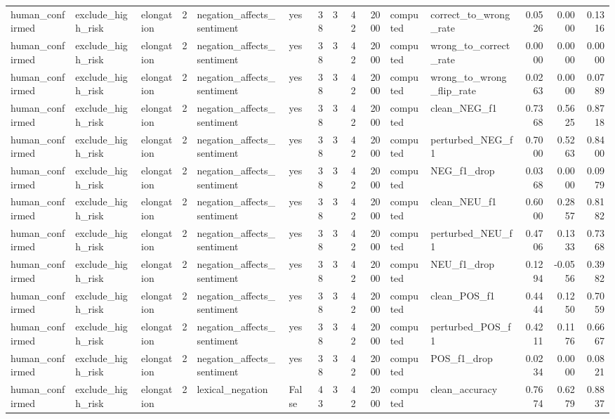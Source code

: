 \begin{tabular}{lllrllrrrrllrrr}
human_confirmed & exclude_high_risk & elongation & 2 & negation_affects_sentiment & yes & 38 & 3 & 42 & 2000 & computed & correct_to_wrong_rate & 0.0526 & 0.0000 & 0.1316 \\
human_confirmed & exclude_high_risk & elongation & 2 & negation_affects_sentiment & yes & 38 & 3 & 42 & 2000 & computed & wrong_to_correct_rate & 0.0000 & 0.0000 & 0.0000 \\
human_confirmed & exclude_high_risk & elongation & 2 & negation_affects_sentiment & yes & 38 & 3 & 42 & 2000 & computed & wrong_to_wrong_flip_rate & 0.0263 & 0.0000 & 0.0789 \\
human_confirmed & exclude_high_risk & elongation & 2 & negation_affects_sentiment & yes & 38 & 3 & 42 & 2000 & computed & clean_NEG_f1 & 0.7368 & 0.5625 & 0.8718 \\
human_confirmed & exclude_high_risk & elongation & 2 & negation_affects_sentiment & yes & 38 & 3 & 42 & 2000 & computed & perturbed_NEG_f1 & 0.7000 & 0.5263 & 0.8400 \\
human_confirmed & exclude_high_risk & elongation & 2 & negation_affects_sentiment & yes & 38 & 3 & 42 & 2000 & computed & NEG_f1_drop & 0.0368 & 0.0000 & 0.0979 \\
human_confirmed & exclude_high_risk & elongation & 2 & negation_affects_sentiment & yes & 38 & 3 & 42 & 2000 & computed & clean_NEU_f1 & 0.6000 & 0.2857 & 0.8182 \\
human_confirmed & exclude_high_risk & elongation & 2 & negation_affects_sentiment & yes & 38 & 3 & 42 & 2000 & computed & perturbed_NEU_f1 & 0.4706 & 0.1333 & 0.7368 \\
human_confirmed & exclude_high_risk & elongation & 2 & negation_affects_sentiment & yes & 38 & 3 & 42 & 2000 & computed & NEU_f1_drop & 0.1294 & -0.0556 & 0.3982 \\
human_confirmed & exclude_high_risk & elongation & 2 & negation_affects_sentiment & yes & 38 & 3 & 42 & 2000 & computed & clean_POS_f1 & 0.4444 & 0.1250 & 0.7059 \\
human_confirmed & exclude_high_risk & elongation & 2 & negation_affects_sentiment & yes & 38 & 3 & 42 & 2000 & computed & perturbed_POS_f1 & 0.4211 & 0.1176 & 0.6667 \\
human_confirmed & exclude_high_risk & elongation & 2 & negation_affects_sentiment & yes & 38 & 3 & 42 & 2000 & computed & POS_f1_drop & 0.0234 & 0.0000 & 0.0821 \\
human_confirmed & exclude_high_risk & elongation & 2 & lexical_negation & False & 43 & 3 & 42 & 2000 & computed & clean_accuracy & 0.7674 & 0.6279 & 0.8837 \\

\end{tabular}
